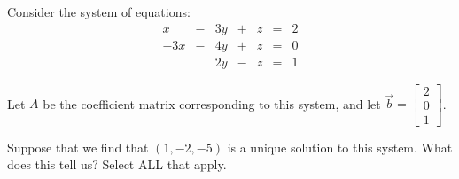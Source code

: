 \documentclass{ximera}
\begin{document}
\begin{exercise}
Consider the system of equations:
$$\begin{matrix}
      x& -&3y&+&z&=&2\\
      -3x & -&4y&+&z&= &0\\
       & &2y&-&z&=&1
    \end{matrix}$$
 
Let $A$ be the coefficient matrix corresponding to this system, and let $\vec{b}=\begin{bmatrix}2\\0\\1\end{bmatrix}$.
 
Suppose that we find that  $(1, -2, -5)$ is a unique solution to this system.  What does this tell us?  Select ALL that apply.
 
\begin{selectAll}
 \end{selectAll}
\end{exercise}
\end{document}
